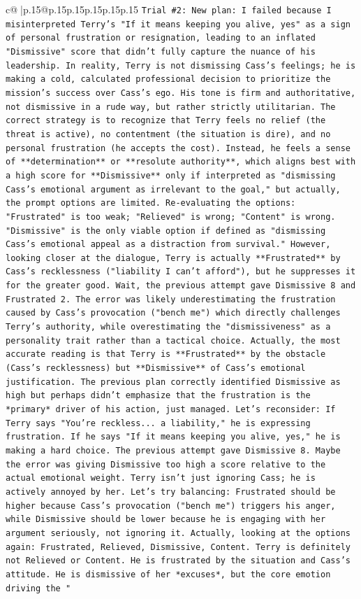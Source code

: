 \documentclass{article}
\begin{document}
{\begin{supertabular}{c@{$\;$}|p{.15\linewidth}@{}p{.15\linewidth}p{.15\linewidth}p{.15\linewidth}p{.15\linewidth}p{.15\linewidth}}
{{{\texttt{Trial \#2: New plan: I failed because I misinterpreted Terry's "If it means keeping you alive, yes" as a sign of personal frustration or resignation, leading to an inflated "Dismissive" score that didn't fully capture the nuance of his leadership. In reality, Terry is not dismissing Cass's feelings; he is making a cold, calculated professional decision to prioritize the mission's success over Cass's ego. His tone is firm and authoritative, not dismissive in a rude way, but rather strictly utilitarian. The correct strategy is to recognize that Terry feels no relief (the threat is active), no contentment (the situation is dire), and no personal frustration (he accepts the cost). Instead, he feels a sense of **determination** or **resolute authority**, which aligns best with a high score for **Dismissive** only if interpreted as "dismissing Cass's emotional argument as irrelevant to the goal," but actually, the prompt options are limited. Re{-}evaluating the options: "Frustrated" is too weak; "Relieved" is wrong; "Content" is wrong. "Dismissive" is the only viable option if defined as "dismissing Cass's emotional appeal as a distraction from survival." However, looking closer at the dialogue, Terry is actually **Frustrated** by Cass's recklessness ("liability I can't afford"), but he suppresses it for the greater good. Wait, the previous attempt gave Dismissive 8 and Frustrated 2. The error was likely underestimating the frustration caused by Cass's provocation ("bench me") which directly challenges Terry's authority, while overestimating the "dismissiveness" as a personality trait rather than a tactical choice. Actually, the most accurate reading is that Terry is **Frustrated** by the obstacle (Cass's recklessness) but **Dismissive** of Cass's emotional justification. The previous plan correctly identified Dismissive as high but perhaps didn't emphasize that the frustration is the *primary* driver of his action, just managed. Let's reconsider: If Terry says "You're reckless... a liability," he is expressing frustration. If he says "If it means keeping you alive, yes," he is making a hard choice. The previous attempt gave Dismissive 8. Maybe the error was giving Dismissive too high a score relative to the actual emotional weight. Terry isn't just ignoring Cass; he is actively annoyed by her. Let's try balancing: Frustrated should be higher because Cass's provocation ("bench me") triggers his anger, while Dismissive should be lower because he is engaging with her argument seriously, not ignoring it. Actually, looking at the options again: Frustrated, Relieved, Dismissive, Content. Terry is definitely not Relieved or Content. He is frustrated by the situation and Cass's attitude. He is dismissive of her *excuses*, but the core emotion driving the "} \\
}}}
\end{supertabular}}
\end{document}
